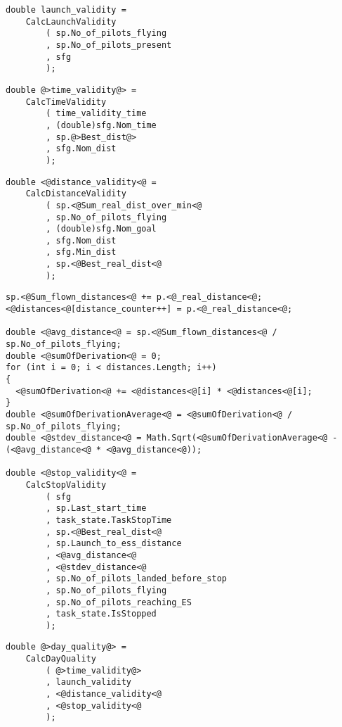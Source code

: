 \documentclass[gap.tex]{subfiles}
\begin{document}
\begin{lstlisting}[style=base, caption={Launch validity doesn't depend on distance inputs.}]
double launch_validity =
    CalcLaunchValidity
        ( sp.No_of_pilots_flying
        , sp.No_of_pilots_present
        , sfg
        );
\end{lstlisting}

\begin{lstlisting}[style=base, caption={Time validity depends on \textcolor{red}{bonus} distance input.}]
double @>time_validity@> =
    CalcTimeValidity
        ( time_validity_time
        , (double)sfg.Nom_time
        , sp.@>Best_dist@>
        , sfg.Nom_dist
        );
\end{lstlisting}

\begin{lstlisting}[style=base, caption={Distance validity depends on \textcolor{blue}{real} distance inputs.}]
double <@distance_validity<@ =
    CalcDistanceValidity
        ( sp.<@Sum_real_dist_over_min<@
        , sp.No_of_pilots_flying
        , (double)sfg.Nom_goal
        , sfg.Nom_dist
        , sfg.Min_dist
        , sp.<@Best_real_dist<@
        );
\end{lstlisting}

\begin{lstlisting}[style=base, caption={Stop validity depends on \textcolor{blue}{real} distance inputs.}]
sp.<@Sum_flown_distances<@ += p.<@_real_distance<@;
<@distances<@[distance_counter++] = p.<@_real_distance<@;

double <@avg_distance<@ = sp.<@Sum_flown_distances<@ / sp.No_of_pilots_flying;
double <@sumOfDerivation<@ = 0;
for (int i = 0; i < distances.Length; i++)
{
  <@sumOfDerivation<@ += <@distances<@[i] * <@distances<@[i];
}
double <@sumOfDerivationAverage<@ = <@sumOfDerivation<@ / sp.No_of_pilots_flying;
double <@stdev_distance<@ = Math.Sqrt(<@sumOfDerivationAverage<@ - (<@avg_distance<@ * <@avg_distance<@));

double <@stop_validity<@ =
    CalcStopValidity
        ( sfg
        , sp.Last_start_time
        , task_state.TaskStopTime
        , sp.<@Best_real_dist<@
        , sp.Launch_to_ess_distance
        , <@avg_distance<@
        , <@stdev_distance<@
        , sp.No_of_pilots_landed_before_stop
        , sp.No_of_pilots_flying
        , sp.No_of_pilots_reaching_ES
        , task_state.IsStopped
        );
\end{lstlisting}

\begin{lstlisting}[style=base, caption={Day quality depends on \textcolor{red}{bonus} distance.}]
double @>day_quality@> =
    CalcDayQuality
        ( @>time_validity@>
        , launch_validity
        , <@distance_validity<@
        , <@stop_validity<@
        );
\end{lstlisting}
\end{document}
